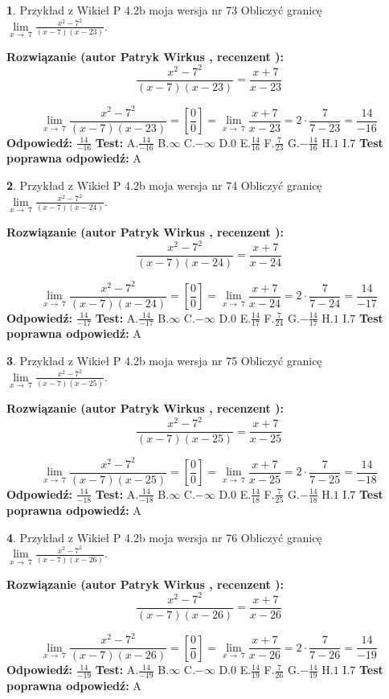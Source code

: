 \documentclass[12pt, a4paper]{article}
\theoremstyle{definition} %
\newtheorem{zad}{}
\newcommand{\zadStart}[1]{\begin{zad}#1\newline}
\newcommand{\zadStop}{\end{zad}}
\newcommand{\rozwStart}[2]{\noindent \textbf{Rozwiązanie (autor #1 , recenzent #2): }\newline}
\newcommand{\rozwStop}{\newline}
\newcommand{\odpStart}{\noindent \textbf{Odpowiedź:}\newline}
\newcommand{\odpStop}{\newline}
\newcommand{\testStart}{\noindent \textbf{Test:}\newline}
\newcommand{\testStop}{\newline}
\newcommand{\kluczStart}{\noindent \textbf{Test poprawna odpowiedź:}\newline}
\newcommand{\kluczStop}{\newline}
\begin{document}
\zadStart{Przykład z Wikieł P 4.2b moja wersja nr 73}
Obliczyć granicę $\lim\limits_{x\to\ 7}\frac{x^{2}-7^{2}}{(x-7)(x-23)}$.
\zadStop
\rozwStart{Patryk Wirkus}{}
$$\frac{x^{2}-7^{2}}{(x-7)(x-23)}=\frac{x+7}{x-23}$$

$$\lim\limits_{x\to\ 7}\frac{x^{2}-7^{2}}{(x-7)(x-23)}=[\frac{0}{0}]=\lim\limits_{x\to\ 7}\frac{x+7}{x-23}=2 \cdot \frac{7}{7-23} = \frac{14}{-16}$$
\rozwStop
\odpStart
$\frac{14}{-16}$
\odpStop
\testStart
A.$\frac{14}{-16}$
B.$\infty$
C.$-\infty$
D.$0$
E.$\frac{14}{16}$
F.$\frac{7}{23}$
G.$-\frac{14}{16}$
H.$1$
I.$7$
\testStop
\kluczStart
A
\kluczStop



\zadStart{Przykład z Wikieł P 4.2b moja wersja nr 74}
Obliczyć granicę $\lim\limits_{x\to\ 7}\frac{x^{2}-7^{2}}{(x-7)(x-24)}$.
\zadStop
\rozwStart{Patryk Wirkus}{}
$$\frac{x^{2}-7^{2}}{(x-7)(x-24)}=\frac{x+7}{x-24}$$

$$\lim\limits_{x\to\ 7}\frac{x^{2}-7^{2}}{(x-7)(x-24)}=[\frac{0}{0}]=\lim\limits_{x\to\ 7}\frac{x+7}{x-24}=2 \cdot \frac{7}{7-24} = \frac{14}{-17}$$
\rozwStop
\odpStart
$\frac{14}{-17}$
\odpStop
\testStart
A.$\frac{14}{-17}$
B.$\infty$
C.$-\infty$
D.$0$
E.$\frac{14}{17}$
F.$\frac{7}{24}$
G.$-\frac{14}{17}$
H.$1$
I.$7$
\testStop
\kluczStart
A
\kluczStop



\zadStart{Przykład z Wikieł P 4.2b moja wersja nr 75}
Obliczyć granicę $\lim\limits_{x\to\ 7}\frac{x^{2}-7^{2}}{(x-7)(x-25)}$.
\zadStop
\rozwStart{Patryk Wirkus}{}
$$\frac{x^{2}-7^{2}}{(x-7)(x-25)}=\frac{x+7}{x-25}$$

$$\lim\limits_{x\to\ 7}\frac{x^{2}-7^{2}}{(x-7)(x-25)}=[\frac{0}{0}]=\lim\limits_{x\to\ 7}\frac{x+7}{x-25}=2 \cdot \frac{7}{7-25} = \frac{14}{-18}$$
\rozwStop
\odpStart
$\frac{14}{-18}$
\odpStop
\testStart
A.$\frac{14}{-18}$
B.$\infty$
C.$-\infty$
D.$0$
E.$\frac{14}{18}$
F.$\frac{7}{25}$
G.$-\frac{14}{18}$
H.$1$
I.$7$
\testStop
\kluczStart
A
\kluczStop



\zadStart{Przykład z Wikieł P 4.2b moja wersja nr 76}
Obliczyć granicę $\lim\limits_{x\to\ 7}\frac{x^{2}-7^{2}}{(x-7)(x-26)}$.
\zadStop
\rozwStart{Patryk Wirkus}{}
$$\frac{x^{2}-7^{2}}{(x-7)(x-26)}=\frac{x+7}{x-26}$$

$$\lim\limits_{x\to\ 7}\frac{x^{2}-7^{2}}{(x-7)(x-26)}=[\frac{0}{0}]=\lim\limits_{x\to\ 7}\frac{x+7}{x-26}=2 \cdot \frac{7}{7-26} = \frac{14}{-19}$$
\rozwStop
\odpStart
$\frac{14}{-19}$
\odpStop
\testStart
A.$\frac{14}{-19}$
B.$\infty$
C.$-\infty$
D.$0$
E.$\frac{14}{19}$
F.$\frac{7}{26}$
G.$-\frac{14}{19}$
H.$1$
I.$7$
\testStop
\kluczStart
A
\kluczStop
\end{document}

